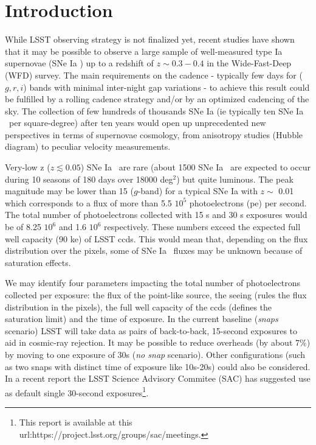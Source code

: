 \documentclass[\docopts]{\docclass}
\newcommand{\sne}{{SNe Ia }}
\newcommand{\pe}{{pe}}
\newcommand{\degsq}{deg$^2$}
\begin{document}
\section{Introduction}
\label{sec:intro}
While LSST observing strategy is not finalized yet, recent studies \cite{2018arXiv181200515L} have shown that it may be possible to observe a large sample of well-measured type Ia supernovae (\sne) up to a redshift of $z\sim 0.3-0.4$ in the Wide-Fast-Deep (WFD) survey. The main requirements on the cadence - typically few days for ($g,r,i$) bands with minimal inter-night gap variations - to achieve this result could be fulfilled by a rolling cadence strategy and/or by an optimized cadencing of the sky. The collection of few hundreds of thousands \sne (ie typically ten \sne~per square-degree) after ten years would open up unprecedented new perspectives in terms of supernovae cosmology, from anisotropy studies (Hubble diagram) to peculiar velocity measurements.\par
Very-low z ($z \lesssim 0.05$) \sne~are rare (about 1500 \sne~are expected to occur during 10 seasons of 180 days over 18000 \degsq) but quite luminous. The peak magnitude may be lower than 15 ($g$-band) for a typical \sne with $z\sim$ 0.01 which corresponds to a flux of more than 5.5 \textrm{$10^5$} photoelectrons (\pe) per second. The total number of photoelectrons collected with 15 s and 30 s exposures would be of 8.25 $ 10^{6}$ and 1.6 $ 10^{6}$ respectively.  These numbers exceed the expected full well capacity (90 ke) of LSST ccds. This would mean that, depending on the flux distribution over the pixels, some of \sne~fluxes may be unknown because of saturation effects. \par
We may identify four parameters impacting the total number of photoelectrons collected per exposure: the flux of the point-like source, the seeing (rules the flux distribution in the pixels), the full well capacity of the ccds (defines the saturation limit) and the time of exposure. In the current baseline ({\it snaps} scenario) LSST will take data as pairs of back-to-back, 15-second exposures to aid in cosmic-ray rejection. It may be possible to reduce overheads (by about 7\%) by moving to one exposure of 30s ({\it no snap} scenario). Other configurations (such as two snaps with distinct time of exposure like 10s-20s) could also be considered. In a recent report the LSST Science Advisory Commitee (SAC) has suggested use as default single 30-second exposures\footnote{This report is available at this url:https://project.lsst.org/groups/sac/meetings.}.\par
\end{document}

